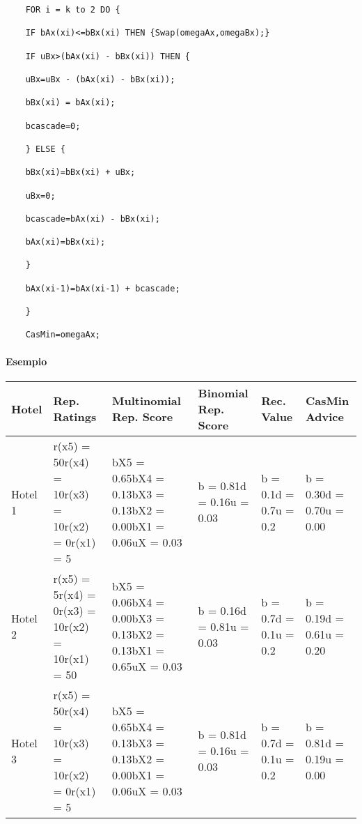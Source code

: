 \documentclass{report}
\begin{document}
	\begin{verbatim}
	FOR i = k to 2 DO {
	
	IF bAx(xi)<=bBx(xi) THEN {Swap(omegaAx,omegaBx);}
	
	IF uBx>(bAx(xi) - bBx(xi)) THEN {
	
	uBx=uBx - (bAx(xi) - bBx(xi));
	
	bBx(xi) = bAx(xi);
	
	bcascade=0;
	
	} ELSE {
	
	bBx(xi)=bBx(xi) + uBx;
	
	uBx=0;
	
	bcascade=bAx(xi) - bBx(xi);
	
	bAx(xi)=bBx(xi);
	
	}
	
	bAx(xi-1)=bAx(xi-1) + bcascade;
	
	}
	
	CasMin=omegaAx;
	\end{verbatim}
	
	\hypertarget{header-n158}{%
		\paragraph{Esempio}\label{header-n158}}
	
	\begin{longtable}[]{@{}llllll@{}}
		\toprule
		Hotel & Rep. Ratings & Multinomial Rep. Score & Binomial Rep. Score &
		Rec. Value & CasMin Advice\tabularnewline
		\midrule
		\endhead
		Hotel 1 & r(x5) = 50r(x4) = 10r(x3) = 10r(x2) = 0r(x1) = 5 & bX5 =
		0.65bX4 = 0.13bX3 = 0.13bX2 = 0.00bX1 = 0.06uX = 0.03 & b = 0.81d =
		0.16u = 0.03 & b = 0.1d = 0.7u = 0.2 & b = 0.30d = 0.70u =
		0.00\tabularnewline
		Hotel 2 & r(x5) = 5r(x4) = 0r(x3) = 10r(x2) = 10r(x1) = 50 & bX5 =
		0.06bX4 = 0.00bX3 = 0.13bX2 = 0.13bX1 = 0.65uX = 0.03 & b = 0.16d =
		0.81u = 0.03 & b = 0.7d = 0.1u = 0.2 & b = 0.19d = 0.61u =
		0.20\tabularnewline
		Hotel 3 & r(x5) = 50r(x4) = 10r(x3) = 10r(x2) = 0r(x1) = 5 & bX5 =
		0.65bX4 = 0.13bX3 = 0.13bX2 = 0.00bX1 = 0.06uX = 0.03 & b = 0.81d =
		0.16u = 0.03 & b = 0.7d = 0.1u = 0.2 & b = 0.81d = 0.19u =
		0.00\tabularnewline
		\bottomrule
	\end{longtable}
	
\end{document}
